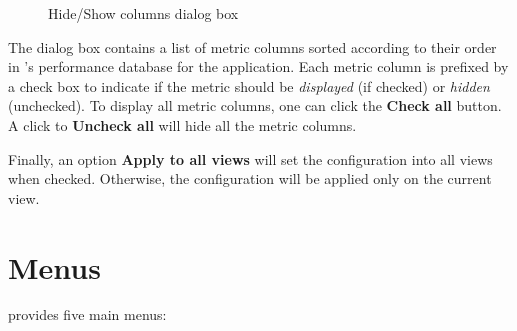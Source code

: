 \begin{itemize}
\begin{figure}[t]
\caption{Hide/Show columns dialog box}
\label{fig:hpcviewer-hide-show-columns}
\end{figure}

The dialog box contains a list of metric columns sorted according to their order in \HPCToolkit{}'s performance database for the application.
Each metric column is prefixed by a check box to indicate if the metric should be \textit{displayed} (if checked) or \textit{hidden} (unchecked).
To display all metric columns, one can click the \textbf{Check all} button.
A click to \textbf{Uncheck all} will hide all the metric columns.

Finally, an option \textbf{Apply to all views} will set the configuration into all views when checked.
Otherwise, the configuration will be applied only on the current view.

\end{itemize}



\section{Menus}

\hpcviewer{} provides five main menus:


